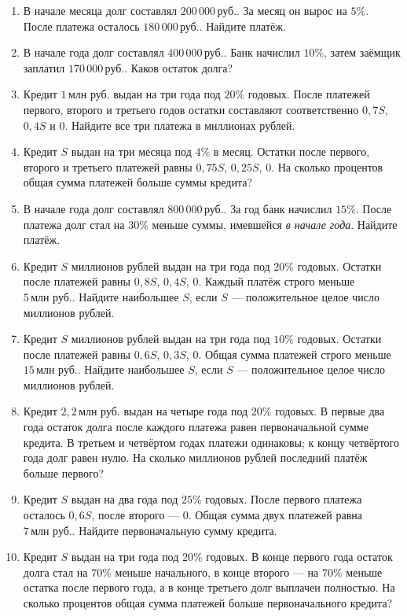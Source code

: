 \documentclass[a4paper,12pt]{article}
\newcommand{\mln}{\,\text{млн руб.}}
\newcommand{\rub}{\,\text{руб.}}
\begin{document}
\begin{enumerate}
\item В начале месяца долг составлял $200\,000\rub$. За месяц он вырос на $5\%$. После платежа осталось $180\,000\rub$. Найдите платёж.

\item В начале года долг составлял $400\,000\rub$. Банк начислил $10\%$, затем заёмщик заплатил $170\,000\rub$. Каков остаток долга?

\item Кредит $1\mln$ выдан на три года под $20\%$ годовых. После платежей первого, второго и третьего годов остатки составляют соответственно $0{,}7S$, $0{,}4S$ и $0$. Найдите все три платежа в миллионах рублей.

\item Кредит $S$ выдан на три месяца под $4\%$ в месяц. Остатки после первого, второго и третьего платежей равны $0{,}75S$, $0{,}25S$, $0$. На сколько процентов общая сумма платежей больше суммы кредита?

\item В начале года долг составлял $800\,000\rub$. За год банк начислил $15\%$. После платежа долг стал на $30\%$ меньше суммы, имевшейся \emph{в начале года}. Найдите платёж.

\item Кредит $S$ миллионов рублей выдан на три года под $20\%$ годовых. Остатки после платежей равны $0{,}8S$, $0{,}4S$, $0$. Каждый платёж строго меньше $5\mln$. Найдите наибольшее $S$, если $S$ --- положительное целое число миллионов рублей.

\item Кредит $S$ миллионов рублей выдан на три года под $10\%$ годовых. Остатки после платежей равны $0{,}6S$, $0{,}3S$, $0$. Общая сумма платежей строго меньше $15\mln$. Найдите наибольшее $S$, если $S$ --- положительное целое число миллионов рублей.

\item Кредит $2{,}2\mln$ выдан на четыре года под $20\%$ годовых. В первые два года остаток долга после каждого платежа равен первоначальной сумме кредита. В третьем и четвёртом годах платежи одинаковы; к концу четвёртого года долг равен нулю. На сколько миллионов рублей последний платёж больше первого?

\item Кредит $S$ выдан на два года под $25\%$ годовых. После первого платежа осталось $0{,}6S$, после второго --- $0$. Общая сумма двух платежей равна $7\mln$. Найдите первоначальную сумму кредита.

\item Кредит $S$ выдан на три года под $20\%$ годовых. В конце первого года остаток долга стал на $70\%$ меньше начального, в конце второго --- на $70\%$ меньше остатка после первого года, а в конце третьего долг выплачен полностью. На сколько процентов общая сумма платежей больше первоначального кредита?
\end{enumerate}
\end{document}
